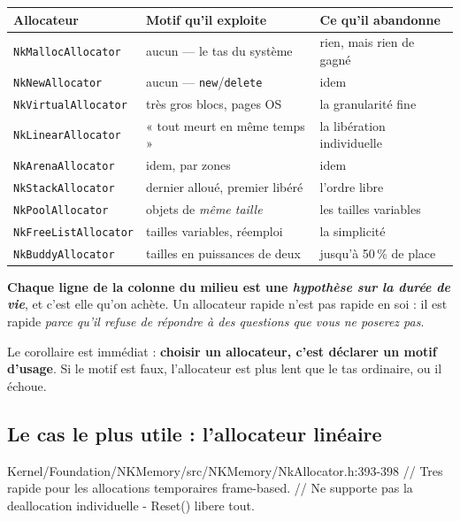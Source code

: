 \begin{center}
\begin{tabular}{@{}lll@{}}
\toprule
\textbf{Allocateur} & \textbf{Motif qu'il exploite} & \textbf{Ce qu'il abandonne} \\
\midrule
\texttt{NkMallocAllocator} & aucun --- le tas du système & rien, mais rien de gagné \\
\texttt{NkNewAllocator} & aucun --- \texttt{new}/\texttt{delete} & idem \\
\texttt{NkVirtualAllocator} & très gros blocs, pages OS & la granularité fine \\
\texttt{NkLinearAllocator} & « tout meurt en même temps » & la libération individuelle \\
\texttt{NkArenaAllocator} & idem, par zones & idem \\
\texttt{NkStackAllocator} & dernier alloué, premier libéré & l'ordre libre \\
\texttt{NkPoolAllocator} & objets de \emph{même taille} & les tailles variables \\
\texttt{NkFreeListAllocator} & tailles variables, réemploi & la simplicité \\
\texttt{NkBuddyAllocator} & tailles en puissances de deux & jusqu'à 50\,\% de place \\
\bottomrule
\end{tabular}
\end{center}

\begin{nkretenir}
\textbf{Chaque ligne de la colonne du milieu est une \emph{hypothèse sur la durée
de vie}}, et c'est elle qu'on achète. Un allocateur rapide n'est pas rapide en
soi : il est rapide \emph{parce qu'il refuse de répondre à des questions que
vous ne poserez pas}.

Le corollaire est immédiat : \textbf{choisir un allocateur, c'est déclarer un
motif d'usage}. Si le motif est faux, l'allocateur est plus lent que le tas
ordinaire, ou il échoue.
\end{nkretenir}

\subsection{Le cas le plus utile : l'allocateur linéaire}

\begin{nkcode}{Kernel/Foundation/NKMemory/src/NKMemory/NkAllocator.h:393-398}
// Tres rapide pour les allocations temporaires frame-based.
// Ne supporte pas la deallocation individuelle - Reset() libere tout.
\end{nkcode}

